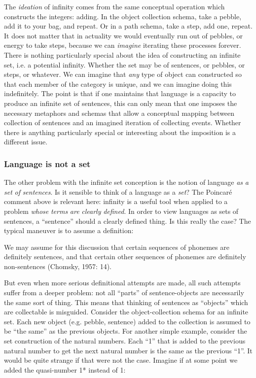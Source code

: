  The \textit{ideation} of infinity comes from the same conceptual operation which constructs the integers: adding. In the object collection schema, take a pebble, add it to your bag, and repeat. Or in a path schema, take a step, add one, repeat. It does not matter that in actuality we would eventually run out of pebbles, or energy to take steps, because we can \textit{imagine} iterating these processes forever. There is nothing particularly special about the idea of constructing an infinite set, i.e. a potential infinity. Whether the set may be of sentences, or pebbles, or steps, or whatever. We can imagine that \textit{any} type of object can constructed so that each member of the category is unique, and we can imagine doing this indefinitely. The point is that if one maintains that language is a capacity to produce an infinite set of sentences, this can only mean that one imposes the necessary metaphors and schemas that allow a conceptual mapping between collection of sentences and an imagined iteration of collecting events. Whether there is anything particularly special or interesting about the imposition is a different issue.

\subsubsection{Language is not a set}

The other problem with the infinite set conception is the notion of language \textit{as} \textit{a} \textit{set} \textit{of} \textit{sentences}. Is it sensible to think of a language as a \textit{set}? The Poincaré comment above is relevant here: infinity is a useful tool when applied to a problem \textit{whose} \textit{terms} \textit{are} \textit{clearly} \textit{defined}. In order to view languages as sets of sentences, a “sentence” should a clearly defined thing. Is this really the case? The typical maneuver is to assume a definition:

We may assume for this discussion that certain sequences of phonemes are definitely sentences, and that certain other sequences of phonemes are definitely non-sentences (Chomsky, 1957: 14).

  But even when more serious definitional attempts are made, all such attempts suffer from a deeper problem: not all “parts” of sentence-objects are necessarily the same sort of thing. This means that thinking of sentences as “objects” which are collectable is misguided. Consider the object-collection schema for an infinite set. Each new object (e.g. pebble, sentence) added to the collection is assumed to be “the same” as the previous objects. For another simple example, consider the set construction of the natural numbers. Each “1” that is added to the previous natural number to get the next natural number is the same as the previous “1”. It would be quite strange if that were not the case. Imagine if at some point we added the quasi-number 1* instead of 1:

